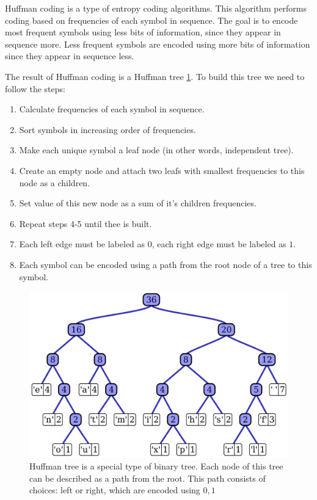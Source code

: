 Huffman coding is a type of entropy coding algorithms. This algorithm performs coding based on frequencies of each symbol in sequence. The goal is to encode most frequent symbols using less bits of information, since they appear in sequence more. Less frequent symbols are encoded using more bits of information since they appear in sequence less.

The result of Huffman coding is a Huffman tree \ref{huffman-tree}. To build this tree we need to follow the steps:

\begin{enumerate}
    \item Calculate frequencies of each symbol in sequence.
    \item Sort symbols in increasing order of frequencies.
    \item Make each unique symbol a leaf node (in other words, independent tree).
    \item Create an empty node and attach two leafs with smallest frequencies to this node as a children.
    \item Set value of this new node as a sum of it's children frequencies.
    \item Repeat steps 4-5 until thee is built.
    \item Each left edge must be labeled as $0$, each right edge must be labeled as $1$.
    \item Each symbol can be encoded using a path from the root node of a tree to this symbol.
\end{enumerate}

\begin{figure}[!ht]
    \centering
    \includegraphics[width=\textwidth]{figure/Huffman_tree_2.svg.png}
    \caption{Huffman tree is a special type of binary tree. Each node of this tree can be described as a path from the root. This path consists of choices: left or right, which are encoded using ${0, 1}$}
    \label{huffman-tree}
\end{figure}

